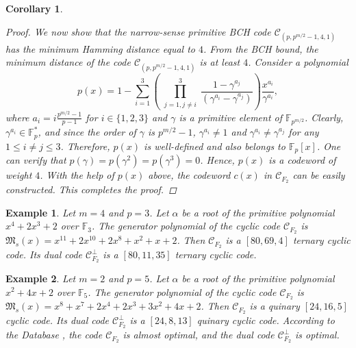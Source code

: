 \documentclass[pdflatex,sn-mathphys-num]{sn-jnl}%
\theoremstyle{thmstyleone}%
\newtheorem{corollary}{Corollary}%
\theoremstyle{thmstyletwo}%
\newtheorem{example}{Example}%
\theoremstyle{thmstylethree}%
\begin{document}
\begin{corollary}
\begin{proof}
        \par We now show that the narrow-sense primitive BCH code $\mathcal{C}_{(p,p^{m/2}-1,4,1)}$ has the minimum Hamming distance equal to $4$. From the BCH bound, the minimum distance of the code $\mathcal{C}_{(p,p^{m/2}-1,4,1)}$ is at least $4$. Consider a polynomial 
        \begin{equation*}
            p(x)=1-\sum_{i=1}^{3}\left(\prod_{\substack{j=1,j\neq i}}^{3}\frac{1-\gamma^{a_{j}}}{(\gamma^{a_{i}}-\gamma^{a_{j}})}\right)\frac{x^{a_{i}}}{\gamma^{a_{i}}}, 
        \end{equation*}
        where $a_{i}=i\frac{p^{m/2}-1}{p-1}$ for $i\in\{1,2,3\}$ and $\gamma$ is a primitive element of $\mathbb{F}_{p^{m/2}}$. Clearly, $\gamma^{a_{i}}\in\mathbb{F}_{p}^{*}$, and since the order of $\gamma$ is $p^{m/2}-1$, $\gamma^{a_{i}}\neq 1$ and $\gamma^{a_{i}}\neq\gamma^{a_{j}}$ for any $1\leq i\neq j\leq 3$. Therefore, $p(x)$ is well-defined and also belongs to $\mathbb{F}_{p}[x]$. One can verify that $p(\gamma)=p(\gamma^2)=p(\gamma^{3})=0$. Hence, $p(x)$ is a codeword of weight $4$. With the help of $p(x)$ above, the codeword $c(x)$ in $\mathcal{C}_{F_{2}}$ can be easily constructed. This completes the proof.
    \end{proof}
\end{corollary}
\vspace{1em}
\begin{example}
     Let $m=4$ and $p=3$. Let $\alpha$ be a root of the primitive polynomial $x^4 + 2x^3 + 2$ over $\mathbb{F}_{3}$. The generator polynomial of the cyclic code $\mathcal{C}_{F_{2}}$ is $\mathfrak{M}_{s}(x)=x^{11} + 2x^{10} +  2x^8 + x^2 + x + 2$. Then $\mathcal{C}_{F_{2}}$ is a $[80, 69, 4]$ ternary cyclic code. Its dual code  $\mathcal{C}_{F_{2}}^{\perp}$ is a $[80, 11, 35]$ ternary cyclic code.
\end{example}
\vspace{1em}
\begin{example}
    Let $m=2$ and $p=5$. Let $\alpha$ be a root of the primitive polynomial $x^2 + 4x + 2$ over $\mathbb{F}_{5}$. The generator polynomial of the cyclic code $\mathcal{C}_{F_{2}}$ is $\mathfrak{M}_{s}(x)=x^8 + x^7 + 2x^4 + 2x^3 + 3x^2 + 4x + 2$. Then $\mathcal{C}_{F_{2}}$ is a quinary $[24,16,5]$ cyclic code. Its dual code  $\mathcal{C}_{F_{2}}^{\perp}$ is a $[24,8,13]$ quinary cyclic code. According to the Database \textnormal{\cite{Database}}, the code $\mathcal{C}_{F_{2}}$ is almost optimal, and the dual code $\mathcal{C}_{F_{2}}^{\perp}$ is optimal.
\end{example}
\end{document}
